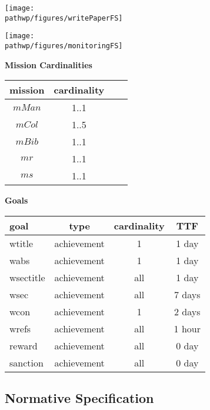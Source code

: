 \documentclass{article}
\newcommand{\goal}[1]{{\textsf{#1}}}
\newcommand{\pathwp}{../../examples/writePaper}
\theoremstyle{definition} \newtheorem{definition}{Definition}
\begin{document}
\begin{center}
  \texttt{[image: \\pathwp/figures/writePaperFS]}

  \texttt{[image: \\pathwp/figures/monitoringFS]}

  \newpage 
  \textbf{Mission Cardinalities}

  \begin{tabular}{c c c c}
      \toprule
      mission & cardinality \\
      \midrule
      $mMan$ & 1..1 \\
      $mCol$ & 1..5 \\
      $mBib$ & 1..1 \\
      \midrule
      $mr$ & 1..1 \\
      $ms$ & 1..1 \\
     \bottomrule
   \end{tabular}

   \bigskip

   \textbf{Goals}

   \begin{tabular}{l c c c}
      \toprule
      goal & type & cardinality &  TTF \\
      \midrule
      \goal{wtitle} & achievement & 1 & 1 day\\
      \goal{wabs} & achievement & 1 & 1 day\\
      \goal{wsectitle} & achievement & all & 1 day\\
      \goal{wsec} & achievement & all & 7 days\\
      \goal{wcon} & achievement & 1 & 2 days\\
      \goal{wrefs} & achievement & all & 1 hour\\
      \midrule
      \goal{reward} & achievement & all & 0 day\\
      \goal{sanction} & achievement & all & 0 day\\
     \bottomrule
    \end{tabular}

\end{center}

\subsection{Normative Specification}
\end{document}
